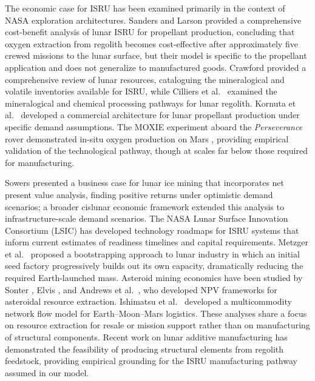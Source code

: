 \documentclass[preprint,12pt]{elsarticle}
\begin{document}
The economic case for ISRU has been examined primarily in the context of NASA exploration architectures. Sanders and Larson \cite{sanders2015} provided a comprehensive cost-benefit analysis of lunar ISRU for propellant production, concluding that oxygen extraction from regolith becomes cost-effective after approximately five crewed missions to the lunar surface, but their model is specific to the propellant application and does not generalize to manufactured goods. Crawford \cite{crawford2015} provided a comprehensive review of lunar resources, cataloguing the mineralogical and volatile inventories available for ISRU, while Cilliers et al.\ \cite{cilliers2023} examined the mineralogical and chemical processing pathways for lunar regolith. Kornuta et al.\ \cite{kornuta2019} developed a commercial architecture for lunar propellant production under specific demand assumptions. The MOXIE experiment aboard the \textit{Perseverance} rover demonstrated in-situ oxygen production on Mars \cite{hecht2021}, providing empirical validation of the technological pathway, though at scales far below those required for manufacturing.

Sowers \cite{sowers2021} presented a business case for lunar ice mining that incorporates net present value analysis, finding positive returns under optimistic demand scenarios; a broader cislunar economic framework \cite{sowers2023} extended this analysis to infrastructure-scale demand scenarios. The NASA Lunar Surface Innovation Consortium (LSIC) \cite{lsic2021} has developed technology roadmaps for ISRU systems that inform current estimates of readiness timelines and capital requirements. Metzger et al.\ \cite{metzger2013} proposed a bootstrapping approach to lunar industry in which an initial seed factory progressively builds out its own capacity, dramatically reducing the required Earth-launched mass. Asteroid mining economics have been studied by Sonter \cite{sonter1997}, Elvis \cite{elvis2012}, and Andrews et al.\ \cite{andrews2015}, who developed NPV frameworks for asteroidal resource extraction. Ishimatsu et al.\ \cite{ishimatsu2016} developed a multicommodity network flow model for Earth--Moon--Mars logistics. These analyses share a focus on resource extraction for resale or mission support rather than on manufacturing of structural components. Recent work on lunar additive manufacturing \cite{werkheiser2015,cesaretti2014} has demonstrated the feasibility of producing structural elements from regolith feedstock, providing empirical grounding for the ISRU manufacturing pathway assumed in our model.
\end{document}
